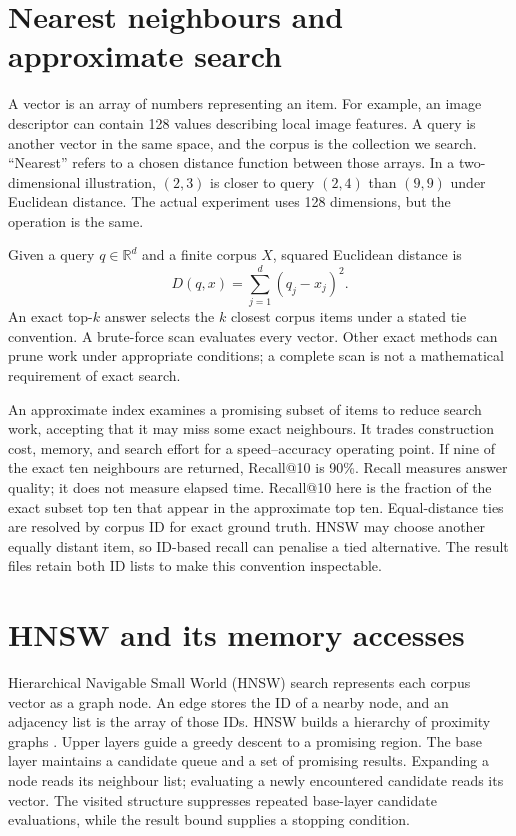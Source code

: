 \documentclass[11pt,a4paper]{report}
\begin{document}
\section{Nearest neighbours and approximate search}
A vector is an array of numbers representing an item. For example, an image descriptor can contain 128 values describing local image features. A query is another vector in the same space, and the corpus is the collection we search. ``Nearest'' refers to a chosen distance function between those arrays. In a two-dimensional illustration, $(2,3)$ is closer to query $(2,4)$ than $(9,9)$ under Euclidean distance. The actual experiment uses 128 dimensions, but the operation is the same.

Given a query $q\in\mathbb{R}^{d}$ and a finite corpus $X$, squared Euclidean distance is
\begin{equation}
 D(q,x)=\sum_{j=1}^{d}(q_j-x_j)^2.
\end{equation}
An exact top-$k$ answer selects the $k$ closest corpus items under a stated tie convention. A brute-force scan evaluates every vector. Other exact methods can prune work under appropriate conditions; a complete scan is not a mathematical requirement of exact search.

An approximate index examines a promising subset of items to reduce search work, accepting that it may miss some exact neighbours. It trades construction cost, memory, and search effort for a speed--accuracy operating point. If nine of the exact ten neighbours are returned, Recall@10 is 90\%. Recall measures answer quality; it does not measure elapsed time. Recall@10 here is the fraction of the exact subset top ten that appear in the approximate top ten. Equal-distance ties are resolved by corpus ID for exact ground truth. HNSW may choose another equally distant item, so ID-based recall can penalise a tied alternative. The result files retain both ID lists to make this convention inspectable.

\section{HNSW and its memory accesses}
Hierarchical Navigable Small World (HNSW) search represents each corpus vector as a graph node. An edge stores the ID of a nearby node, and an adjacency list is the array of those IDs. HNSW builds a hierarchy of proximity graphs \cite{hnsw}. Upper layers guide a greedy descent to a promising region. The base layer maintains a candidate queue and a set of promising results. Expanding a node reads its neighbour list; evaluating a newly encountered candidate reads its vector. The visited structure suppresses repeated base-layer candidate evaluations, while the result bound supplies a stopping condition.
\end{document}
